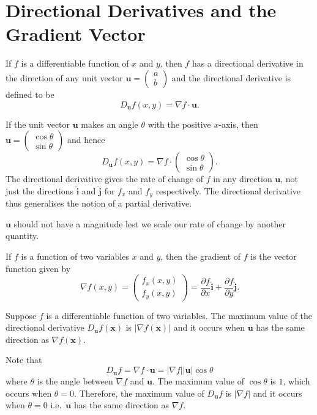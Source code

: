 \documentclass{article}
\begin{document}
\section{Directional Derivatives and the Gradient Vector}
\begin{definition}
    If $f$ is a differentiable function of $x$ and $y$, then $f$ has a directional derivative in the direction of any unit vector $\bm{u}=\begin{pmatrix}
        a\\
        b
    \end{pmatrix}$
    and the directional derivative is defined to be
    $$D_{\bm{u}}f(x,y)=\nabla f\cdot\bm{u}.$$
\end{definition}
If the unit vector $\bm{u}$ makes an angle $\theta$ with the positive $x$-axis, then $\bm{u}=\begin{pmatrix}
    \cos{\theta}\\
    \sin{\theta}
\end{pmatrix}$ and hence
$$D_{\bm{u}}f(x,y)=\nabla f\cdot\begin{pmatrix}
    \cos{\theta}\\
    \sin{\theta}
\end{pmatrix}.$$
The directional derivative gives the rate of change of $f$ in any direction $\bm{u}$, not just the directions $\bm{\hat i}$ and $\bm{\hat j}$ for $f_x$ and $f_y$ respectively. The directional derivative thus generalises the notion of a partial derivative.
\begin{note}
    $\bm{u}$ should not have a magnitude lest we scale our rate of change by another quantity.
\end{note}
\begin{definition}
    If $f$ is a function of two variables $x$ and $y$, then the gradient of $f$ is the vector function given by 
    $$\nabla f(x,y)=\begin{pmatrix}
        f_x(x,y)\\
        f_y(x,y)
    \end{pmatrix}=\frac{\partial f}{\partial x}\bm{\hat i}+\frac{\partial f}{\partial y}\bm{\hat j}.$$
\end{definition}
\begin{theorem}
    Suppose $f$ is a differentiable function of two variables. The maximum value of the directional derivative $D_{\bm{u}}f(\textbf{x})$ is $|\nabla f(\textbf{x})|$ and it occurs when $\bm{u}$ has the same direction as $\nabla f(\textbf{x}).$
\end{theorem}
\begin{replacementproof}
    Note that 
    $$D_{\bm{u}}f=\nabla f\cdot\bm{u}=|\nabla f||\bm{u}|\cos{\theta}$$
    where $\theta$ is the angle between $\nabla f$ and $\bm{u}$. The maximum value of $\cos{\theta}$ is $1$, which occurs when $\theta=0.$ Therefore, the maximum value of $D_{\bm{u}}f$ is $|\nabla f|$ and it occurs when $\theta=0$ i.e.\ $\bm{u}$ has the same direction as $\nabla f$.
\end{replacementproof}
\end{document}
